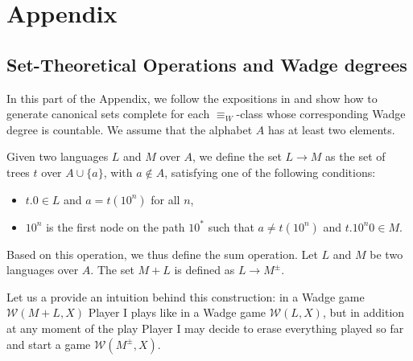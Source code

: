 
\clearpage
\section*{Appendix}

\subsection*{Set-Theoretical Operations and Wadge degrees}

In this part of the Appendix, we follow the expositions in \cite{dup1,dm7} and show how to generate canonical sets complete for each $\equiv_W$-class whose corresponding Wadge degree is countable. We assume that the alphabet $A$ has at least two elements.

\vspace{0.2cm}
\hspace{0.1cm}

\noindent  Given two languages $L$ and $M$ over $A$, we define
 the set $L \to M$ as the set of trees $t$ over $A \cup\{a\}$, with $a \notin A$, satisfying one of the following conditions:

\begin{itemize}
\item $t.0 \in L$ and $a = t(10^n)$ for all $n$,
\item $10^{n}$ is the first node on the path $10^*$ such that $a \neq t(10^{n})$ and $t.10^{n}0 \in M$.
\end{itemize}

Based on this operation, we thus define the sum operation.
Let $L$ and $ M $ be two languages over $A$. The set $M+ L$ is defined as $L \to M^\pm$. 

Let us a provide an intuition behind this construction: in a Wadge game $\mathcal{W}(M+L, X)$ Player I plays like in a Wadge game $\mathcal{W}(L, X)$, but in addition at any moment of the play Player I may decide to erase everything played so far and start a game
$\mathcal{W}(M^\pm, X)$. %


